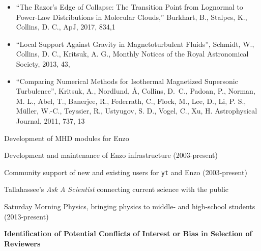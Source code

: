 \documentclass[11pt]{article}
\begin{document}
\begin{itemize}
\item ``The Razor’s Edge of Collapse: The Transition Point from Lognormal to Power-Law Distributions in Molecular Clouds,'' 
Burkhart, B., Stalpes, K., Collins, D. C.,
ApJ, 2017, 834,1

\item
``Local Support Against Gravity in Magnetoturbulent Fluids'',
Schmidt, W., Collins, D. C., Kritsuk, A. G.,
Monthly Notices of the Royal Astronomical Society, 2013, 43, 

\item
``Comparing Numerical
Methods for Isothermal Magnetized Supersonic Turbulence'', 
Kritsuk, A., Nordlund, \AA, Collins, D.~C., 
Padoan, P., Norman, M. L., Abel, T., Banerjee, R., Federrath, C., Flock, M.,
Lee, D., Li, P. S., M\"uller, W.-C., Teyssier, R., Ustyugov, S. D., Vogel, C.,
Xu, H.
Astrophysical Journal, 2011, 737, 13

\end{itemize}



\medskip
\noindent Development of MHD modules for Enzo

\medskip
\noindent Development and maintenance of Enzo infrastructure (2003-present)

\medskip
\noindent Community support of new and existing users for {\tt yt} and Enzo
(2003-present)

\medskip
\noindent Tallahassee's \emph{Ask A Scientist} connecting current science with the public

\medskip
\noindent Saturday Morning Physics, bringing physics to middle- and high-school
students (2013-present)

\medskip
\noindent\textbf{Identification of Potential Conflicts of Interest or Bias in
Selection of Reviewers}






\end{document}
